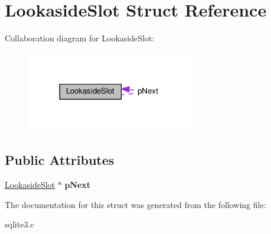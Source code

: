 \hypertarget{structLookasideSlot}{}\section{Lookaside\+Slot Struct Reference}
\label{structLookasideSlot}


Collaboration diagram for Lookaside\+Slot\+:\nopagebreak
\begin{figure}[H]
\begin{center}
\leavevmode
\includegraphics[width=206pt]{structLookasideSlot__coll__graph}
\end{center}
\end{figure}
\subsection*{Public Attributes}
\begin{DoxyCompactItemize}
\item 
\hyperlink{structLookasideSlot}{Lookaside\+Slot} $\ast$ {\bfseries p\+Next}\hypertarget{structLookasideSlot_a3c3dd4a770ded51a68e8a651eba40f66}{}\label{structLookasideSlot_a3c3dd4a770ded51a68e8a651eba40f66}

\end{DoxyCompactItemize}


The documentation for this struct was generated from the following file\+:\begin{DoxyCompactItemize}
\item 
sqlite3.\+c\end{DoxyCompactItemize}
